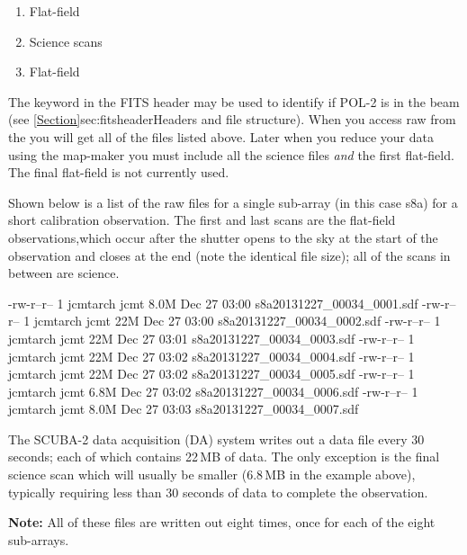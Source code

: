 \begin{enumerate}\itemsep-0.2em
\item Flat-field
\item Science scans
\item Flat-field
\end{enumerate}

The  keyword in the FITS header may be used to
identify if POL-2 is in the beam (see
\cref{Section}{sec:fitsheader}{Headers and file structure}).  When you
access raw from the  you
will get all of the files listed above. Later when you reduce your
data using the map-maker you must include all the science files
\emph{and} the first flat-field.  The final flat-field is not
currently used.

Shown below is a list of the raw files for a single sub-array (in this
case s8a) for a short calibration observation. The first and last
scans are the flat-field observations,which occur after the shutter
opens to the sky at the start of the observation and closes at the end
(note the identical file size); all of the scans in between are
science.


\begin{terminalv}
\end{terminalv}

\begin{terminalv}
-rw-r--r-- 1 jcmtarch jcmt 8.0M Dec 27 03:00 s8a20131227_00034_0001.sdf
-rw-r--r-- 1 jcmtarch jcmt  22M Dec 27 03:00 s8a20131227_00034_0002.sdf
-rw-r--r-- 1 jcmtarch jcmt  22M Dec 27 03:01 s8a20131227_00034_0003.sdf
-rw-r--r-- 1 jcmtarch jcmt  22M Dec 27 03:02 s8a20131227_00034_0004.sdf
-rw-r--r-- 1 jcmtarch jcmt  22M Dec 27 03:02 s8a20131227_00034_0005.sdf
-rw-r--r-- 1 jcmtarch jcmt 6.8M Dec 27 03:02 s8a20131227_00034_0006.sdf
-rw-r--r-- 1 jcmtarch jcmt 8.0M Dec 27 03:03 s8a20131227_00034_0007.sdf
\end{terminalv}

The SCUBA-2 data acquisition (DA) system writes out a data file every
30 seconds; each of which contains 22\,MB of data. The only exception
is the final science scan which will usually be smaller (6.8\,MB in
the example above), typically requiring less than 30 seconds of data
to complete the observation.

\textbf{Note:} All of these files are written out eight times, once
for each of the eight sub-arrays.

